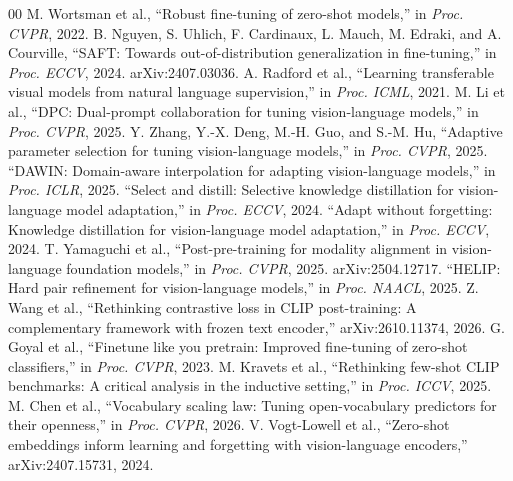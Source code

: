 \documentclass[conference]{IEEEtran}
\begin{document}
\begin{thebibliography}{00}
M. Wortsman et al., ``Robust fine-tuning of zero-shot models,'' in \textit{Proc. CVPR}, 2022.
B. Nguyen, S. Uhlich, F. Cardinaux, L. Mauch, M. Edraki, and A. Courville, ``SAFT: Towards out-of-distribution generalization in fine-tuning,'' in \textit{Proc. ECCV}, 2024. arXiv:2407.03036.
A. Radford et al., ``Learning transferable visual models from natural language supervision,'' in \textit{Proc. ICML}, 2021.
M. Li et al., ``DPC: Dual-prompt collaboration for tuning vision-language models,'' in \textit{Proc. CVPR}, 2025.
Y. Zhang, Y.-X. Deng, M.-H. Guo, and S.-M. Hu, ``Adaptive parameter selection for tuning vision-language models,'' in \textit{Proc. CVPR}, 2025.
``DAWIN: Domain-aware interpolation for adapting vision-language models,'' in \textit{Proc. ICLR}, 2025.
``Select and distill: Selective knowledge distillation for vision-language model adaptation,'' in \textit{Proc. ECCV}, 2024.
``Adapt without forgetting: Knowledge distillation for vision-language model adaptation,'' in \textit{Proc. ECCV}, 2024.
T. Yamaguchi et al., ``Post-pre-training for modality alignment in vision-language foundation models,'' in \textit{Proc. CVPR}, 2025. arXiv:2504.12717.
``HELIP: Hard pair refinement for vision-language models,'' in \textit{Proc. NAACL}, 2025.
Z. Wang et al., ``Rethinking contrastive loss in CLIP post-training: A complementary framework with frozen text encoder,'' arXiv:2610.11374, 2026.
G. Goyal et al., ``Finetune like you pretrain: Improved fine-tuning of zero-shot classifiers,'' in \textit{Proc. CVPR}, 2023.
M. Kravets et al., ``Rethinking few-shot CLIP benchmarks: A critical analysis in the inductive setting,'' in \textit{Proc. ICCV}, 2025.
M. Chen et al., ``Vocabulary scaling law: Tuning open-vocabulary predictors for their openness,'' in \textit{Proc. CVPR}, 2026.
V. Vogt-Lowell et al., ``Zero-shot embeddings inform learning and forgetting with vision-language encoders,'' arXiv:2407.15731, 2024.

\end{thebibliography}
\end{document}
